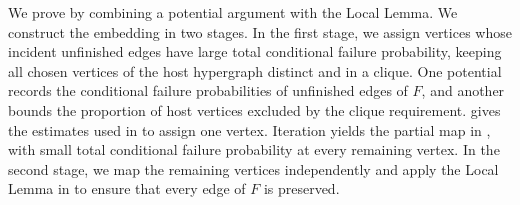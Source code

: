 \documentclass[10pt]{article}
\numberwithin{equation}{section}
\begin{document}
We prove  by combining a potential argument with the Local Lemma. We construct the embedding in two stages. In the first stage, we assign vertices whose incident unfinished edges have large total conditional failure probability, keeping all chosen vertices of the host hypergraph distinct and in a clique. One potential records the conditional failure probabilities of unfinished edges of $F$, and another bounds the proportion of host vertices excluded by the clique requirement.  gives the estimates used in  to assign one vertex. Iteration yields the partial map in , with small total conditional failure probability at every remaining vertex. In the second stage, we map the remaining vertices independently and apply the Local Lemma in  to ensure that every edge of $F$ is preserved.
\end{document}
